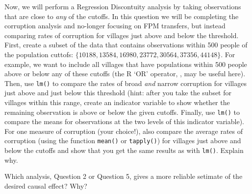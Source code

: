 \documentclass[]{article}
\begin{document}
Now, we will perform a Regression Discontuity analysis by taking
observations that are close to \emph{any} of the cutoffs. In this
question we will be completing the corruption analysis and no-longer
focusing on FPM transfers, but instead comparing rates of corruption for
villages just above and below the threshold. First, create a subset of
the data that contains observations within 500 people of the population
cuttofs: $\{10188, 13584, 16980, 23772, 30564, 37356, 44148\}$. For
example, we want to include all villages that have populations within
500 people above or below any of these cutoffs (the R `OR' operator,
\texttt{\textbar{}}, may be useful here). Then, use \texttt{lm()} to
compare the rates of broad \emph{and} narrow corruption for villages
just above and just below this threshold (hint: after you take the
subset for villages within this range, create an indicator variable to
show whether the remaining observation is above or below the given
cutoffs. Finally, use \texttt{lm()} to compare the means for
observations at the two levels of this indicator variable). For one
measure of corruption (your choice!), also compare the average rates of
corruption (using the function \texttt{mean()} or \texttt{tapply()}) for
villages just above and below the cutoffs and show that you get the same
results as with \texttt{lm()}. Explain why.

Which analysis, Question 2 or Question 5, gives a more reliable setimate
of the desired causal effect? Why?
\end{document}
